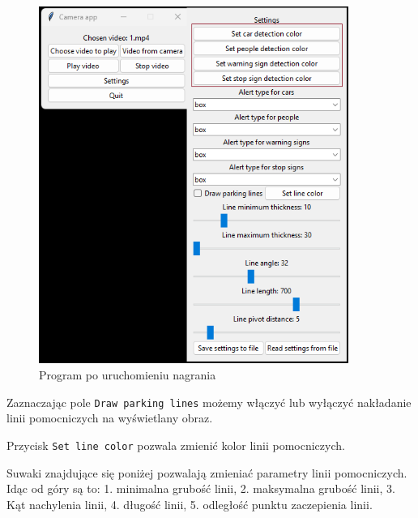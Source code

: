 \begin{figure}[H]
	\centering
	\includegraphics[width=0.9\textwidth]{Img/manual/color_settings.png}
	\caption{Program po uruchomieniu nagrania}
	\label{fig:color_settings}
\end{figure}

\newpage

Zaznaczając pole \verb|Draw parking lines| możemy włączyć lub wyłączyć nakładanie linii pomocniczych na wyświetlany obraz.

Przycisk \verb|Set line color| pozwala zmienić kolor linii pomocniczych.

Suwaki znajdujące się poniżej pozwalają zmieniać parametry linii pomocniczych.
Idąc od góry są to: 1. minimalna grubość linii, 2. maksymalna grubość linii, 3. Kąt nachylenia linii, 4. długość linii, 5. odległość punktu zaczepienia linii.

